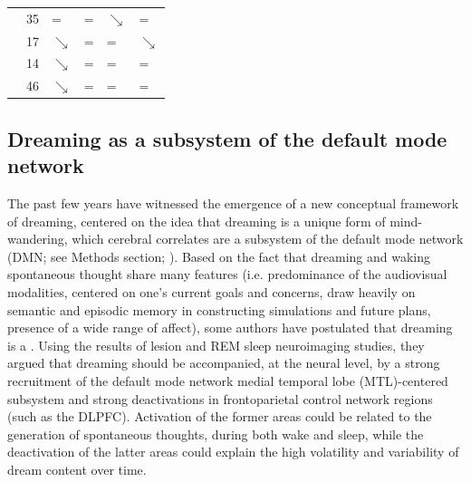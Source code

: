 \begin{table}[!htb]
{\begin{tabularx}{\textwidth}{Xlllll}
	\citealp{marzano_recalling_2011}    & 35         	& =                        			& =                        			& {\color[HTML]{3166FF} $\searrow$}   									& =                               		\\
	\citealp{chellappa_cortical_2011}   & 17         	& {\color[HTML]{3166FF} $\searrow$} & =                        			& =                         											& {\color[HTML]{3166FF} $\searrow$}     \\
	\citealp{scarpelli_predicting_2017} & 14         	& {\color[HTML]{3166FF} $\searrow$} & =                        			& =                          											& =                               		\\
	\citealp{siclari_neural_2017}       & 46         	& {\color[HTML]{3166FF} $\searrow$} & =                        			& =                          											& = 									\\
	\bottomrule
    \end{tabularx}%
    }
\end{table}

\subsection{Dreaming as a subsystem of the default mode network}
\label{sec:dream-research:attempts:dmn}

The past few years have witnessed the emergence of a new conceptual framework of dreaming, centered on the idea that dreaming is a unique form of mind-wandering, which cerebral correlates are a subsystem of the default mode network (DMN; see Methods section; \citealp{maquet_human_2005, domhoff_neural_2011, domhoff_dreaming_2015, christoff_mind-wandering_2016}). Based on the fact that dreaming and waking spontaneous thought share many features (i.e. predominance of the audiovisual modalities, centered on one’s current goals and concerns, draw heavily on semantic and episodic memory in constructing simulations and future plans, presence of a wide range of affect), some authors have postulated that dreaming is a  \citep{christoff_mind-wandering_2016}. Using the results of lesion and REM sleep neuroimaging studies, they argued that dreaming should be accompanied, at the neural level, by a strong recruitment of the default mode network medial temporal lobe (MTL)-centered subsystem and strong deactivations in frontoparietal control network regions (such as the DLPFC). Activation of the former areas could be related to the generation of spontaneous thoughts, during both wake and sleep, while the deactivation of the latter areas could explain the high volatility and variability of dream content over time.
